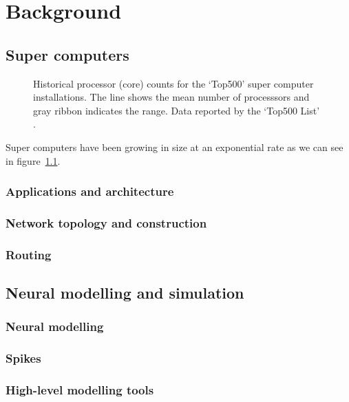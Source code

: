 \chapter{Background}
	
	\label{sec:background}
	
	\section{Super computers}
		
		\begin{figure}
			\center
			
			\caption{Historical processor (core) counts for the `Top500' super
			computer installations. The line shows the mean number of processsors and
			gray ribbon indicates the range. Data reported by the `Top500 List'
			\cite{meuer15j}.}
			\label{fig:top500-num-processors}
		\end{figure}
		
		Super computers have been growing in size at an exponential rate as we can
		see in figure~\ref{fig:top500-num-processors}.
		
		\subsection{Applications and architecture}
		\subsection{Network topology and construction}
		\subsection{Routing}
	
	\section{Neural modelling and simulation}
		\subsection{Neural modelling}
		\subsection{Spikes}
		\subsection{High-level modelling tools}
	

